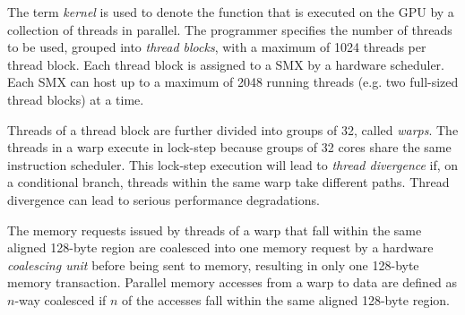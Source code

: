 
The term \emph{kernel} is used to denote the function that is executed on the 
GPU by a collection of threads in parallel.
The programmer specifies the number of threads to be used,
grouped into {\it thread blocks}, with a maximum
of 1024 threads per thread block.
Each thread block is assigned to a SMX by a hardware scheduler. 
Each SMX can host up to a maximum of 2048 running threads (e.g. two full-sized thread blocks) at a time.

Threads of a thread block are further divided into groups of 32, called \emph{warps}. 
The threads in a warp execute in lock-step 
because groups of 32 cores share the same instruction scheduler.
This lock-step execution will lead to {\it thread divergence} if,
on a conditional branch, threads within the same warp take different paths.
Thread divergence can lead to serious performance degradations. 

The memory requests issued by threads of a warp that fall within the same aligned 128-byte region are
coalesced into one memory request by a hardware \emph{coalescing unit} before being sent to memory, resulting in only one 128-byte memory transaction. 
Parallel memory accesses from a warp to data are defined as $n$-way coalesced if $n$ of the accesses fall
within the same aligned 128-byte region.




